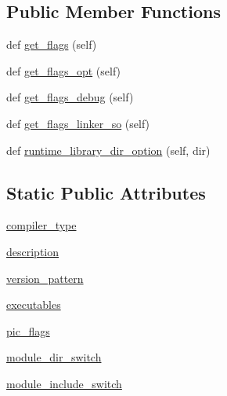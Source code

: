 \subsection*{Public Member Functions}
\begin{DoxyCompactItemize}
\item 
def \hyperlink{classnumpy_1_1distutils_1_1fcompiler_1_1nv_1_1NVHPCFCompiler_a79237ff8fb62e1b0c755ae4669bc2dcd}{get\+\_\+flags} (self)
\item 
def \hyperlink{classnumpy_1_1distutils_1_1fcompiler_1_1nv_1_1NVHPCFCompiler_a9648f2f0395eed15bfed0cdee415efe3}{get\+\_\+flags\+\_\+opt} (self)
\item 
def \hyperlink{classnumpy_1_1distutils_1_1fcompiler_1_1nv_1_1NVHPCFCompiler_a8fa2e85683f259a5fbd0b6b0102ed693}{get\+\_\+flags\+\_\+debug} (self)
\item 
def \hyperlink{classnumpy_1_1distutils_1_1fcompiler_1_1nv_1_1NVHPCFCompiler_a30bd6179a0cf559ac587185a39fe03e7}{get\+\_\+flags\+\_\+linker\+\_\+so} (self)
\item 
def \hyperlink{classnumpy_1_1distutils_1_1fcompiler_1_1nv_1_1NVHPCFCompiler_ad8ee5df47d0c18e966aebf7e819331f7}{runtime\+\_\+library\+\_\+dir\+\_\+option} (self, dir)
\end{DoxyCompactItemize}
\subsection*{Static Public Attributes}
\begin{DoxyCompactItemize}
\item 
\hyperlink{classnumpy_1_1distutils_1_1fcompiler_1_1nv_1_1NVHPCFCompiler_aa538b0ef979aab9b0419c8e02901e0a5}{compiler\+\_\+type}
\item 
\hyperlink{classnumpy_1_1distutils_1_1fcompiler_1_1nv_1_1NVHPCFCompiler_a937ef8d9a3dae50bbcdd30531111381d}{description}
\item 
\hyperlink{classnumpy_1_1distutils_1_1fcompiler_1_1nv_1_1NVHPCFCompiler_af86259a7787ab0767a4da4cb05f6f7d5}{version\+\_\+pattern}
\item 
\hyperlink{classnumpy_1_1distutils_1_1fcompiler_1_1nv_1_1NVHPCFCompiler_ab255c851375da1ae372bc03247450b6b}{executables}
\item 
\hyperlink{classnumpy_1_1distutils_1_1fcompiler_1_1nv_1_1NVHPCFCompiler_a0aa96318310f781dd61c94f54574a7f4}{pic\+\_\+flags}
\item 
\hyperlink{classnumpy_1_1distutils_1_1fcompiler_1_1nv_1_1NVHPCFCompiler_a9eef75946bf7369dc84e3c89d0b37206}{module\+\_\+dir\+\_\+switch}
\item 
\hyperlink{classnumpy_1_1distutils_1_1fcompiler_1_1nv_1_1NVHPCFCompiler_a0338d79cf1770cf62d37d812d4070e95}{module\+\_\+include\+\_\+switch}
\end{DoxyCompactItemize}


